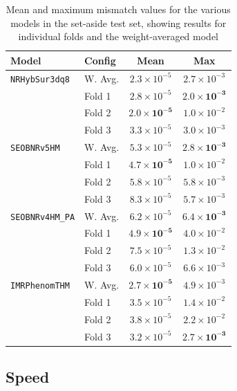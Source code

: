 \documentclass[%
 reprint,
superscriptaddress,
nofootinbib,
 amsmath,amssymb,
 aps,
prd,
floatfix,
]{revtex4-2}
\begin{document}
\renewcommand{\arraystretch}{1.3}
\begin{table}
\centering
\begin{tabular}{llcc}
\hline
\textbf{Model} & \textbf{Config} & \textbf{Mean} & \textbf{Max} \\
\hline
\hline
\texttt{NRHybSur3dq8} 
 & W. Avg.   & $2.3 \times 10^{-5}$ & $2.7 \times 10^{-3}$ \\
 & Fold 1 & $2.8 \times 10^{-5}$ & $\mathbf{2.0 \times 10^{-3}}$ \\
 & Fold 2 & $\mathbf{2.0 \times 10^{-5}}$ & $1.0 \times 10^{-2}$ \\
 & Fold 3 & $3.3 \times 10^{-5}$ & $3.0 \times 10^{-3}$ \\
\hline
\texttt{SEOBNRv5HM} 
 & W. Avg.   & $5.3 \times 10^{-5}$ & $\mathbf{2.8 \times 10^{-3}}$ \\
 & Fold 1 & $\mathbf{4.7 \times 10^{-5}}$ & $1.0 \times 10^{-2}$ \\
 & Fold 2 & $5.8 \times 10^{-5}$ & $5.8 \times 10^{-3}$ \\
 & Fold 3 & $8.3 \times 10^{-5}$ & $5.7 \times 10^{-3}$ \\
\hline
\texttt{SEOBNRv4HM\_PA} 
 & W. Avg.   & $6.2 \times 10^{-5}$ & $\mathbf{6.4 \times 10^{-3}}$ \\
 & Fold 1 & $\mathbf{4.9 \times 10^{-5}}$ & $4.0 \times 10^{-2}$ \\
 & Fold 2 & $7.5 \times 10^{-5}$ & $1.3 \times 10^{-2}$ \\
 & Fold 3 & $6.0 \times 10^{-5}$ & $6.6 \times 10^{-3}$ \\
\hline
\texttt{IMRPhenomTHM} 
 & W. Avg.   & $\mathbf{2.7 \times 10^{-5}}$ & $4.9 \times 10^{-3}$ \\
 & Fold 1 & $3.5 \times 10^{-5}$ & $1.4 \times 10^{-2}$ \\
 & Fold 2 & $3.8 \times 10^{-5}$ & $2.2 \times 10^{-2}$ \\
 & Fold 3 & $3.2 \times 10^{-5}$ & $\mathbf{2.7 \times 10^{-3}}$ \\
\hline
\end{tabular}
\caption{Mean and maximum mismatch values for the various models in the set-aside test set, showing results for individual folds and the weight-averaged model\label{tab:table_label}}

\end{table}
\subsection{Speed}
\end{document}
